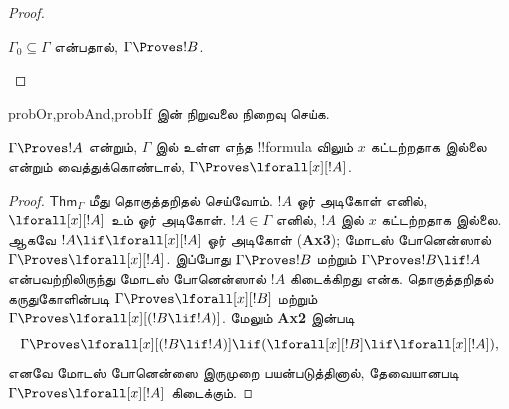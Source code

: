 \documentclass[../../../include/open-logic-section]{subfiles}
\begin{document}
\begin{proof}
\begin{enumerate}
{{%
$\Gamma_0 \subseteq \Gamma$ என்பதால், $\Gamma \Proves !B$.}}


\end{enumerate}
\end{proof}

\begin{probtag}{probOr,probAnd,probIf} 
இன் நிறுவலை நிறைவு செய்க.
\end{probtag}

\begin{thm}[பொதுமைப்படுத்தல்] 
$\Gamma \Proves !A$ என்றும், $\Gamma$ இல் உள்ள எந்த !!{formula} விலும்
$x$ கட்டற்றதாக இல்லை என்றும் வைத்துக்கொண்டால், $\Gamma
\Proves \lforall[x][!A]$.
\end{thm}

\begin{proof} $\mathsf{Thm}_\Gamma$ மீது தொகுத்தறிதல் செய்வோம். $!A$
ஓர் அடிகோள் எனில், $\lforall[x][!A]$ உம் ஓர் அடிகோள். $!A\in \Gamma$
எனில், $!A$ இல் $x$ கட்டற்றதாக இல்லை. ஆகவே $!A \lif
\lforall[x][!A]$ ஓர் அடிகோள் (\textbf{Ax3}); மோடஸ் போனென்ஸால்
$\Gamma \Proves \lforall[x][!A]$. இப்போது $\Gamma \Proves !B$ மற்றும்
$\Gamma \Proves !B \lif !A$ என்பவற்றிலிருந்து மோடஸ் போனென்ஸால் $!A$
கிடைக்கிறது என்க. தொகுத்தறிதல் கருதுகோளின்படி $\Gamma \Proves
\lforall[x][!B]$ மற்றும் $\Gamma \Proves \lforall[x][( !B \lif
!A)]$. மேலும் \textbf{Ax2} இன்படி
\[ \Gamma \Proves
\lforall[x][( !B \lif !A)] \lif (\lforall[x][ !B] \lif \lforall[x][!A]), \]
எனவே மோடஸ் போனென்ஸை இருமுறை பயன்படுத்தினால், தேவையானபடி
$\Gamma \Proves \lforall[x][!A]$ கிடைக்கும்.
\end{proof}
\end{document}
